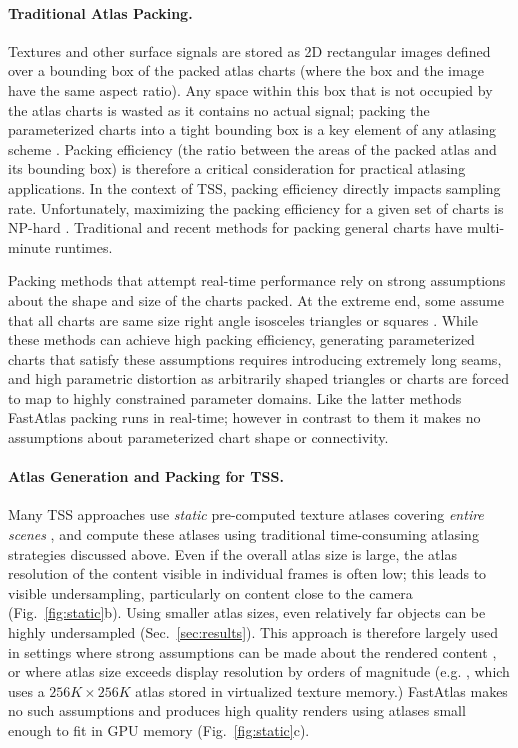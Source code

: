 \paragraph*{Traditional Atlas Packing.} Textures and other surface signals are stored as 2D rectangular images defined over a bounding box of the packed atlas charts (where the box and the image have the same aspect ratio).  Any space within this box that is not occupied by the atlas charts is wasted as it contains no actual signal; packing the parameterized charts into a tight bounding box is a key element of any atlasing scheme \cite{levy2002least,Limper18BoxCutter}. Packing efficiency (the ratio between the areas of the packed atlas and its bounding box) is therefore a critical consideration for practical atlasing applications. In the context of TSS, packing efficiency directly impacts sampling rate. Unfortunately, maximizing the packing efficiency for a given set of charts is NP-hard \cite{Milenkovic1999}. Traditional \cite{levy2002least,igarashi2001adaptive} and recent \cite{Limper18BoxCutter,zhangatlasgeneration,knodt2023uvopt,liu2019atlas} methods for packing general charts have multi-minute runtimes. 

Packing methods that attempt real-time performance rely on strong assumptions about the shape and size of the charts packed. At the extreme end, some assume that all charts are same size right angle isosceles triangles \cite{Maruya:1995,Carr:2002} or squares \cite{purnomo2004seamless}. While these methods can achieve high packing efficiency, generating parameterized charts that satisfy these assumptions requires introducing extremely long seams, and high parametric distortion as arbitrarily shaped triangles or charts are forced to map to highly constrained parameter domains. Like the latter methods FastAtlas packing runs in real-time; however in contrast to them it makes no assumptions about parameterized chart shape or connectivity. 

\paragraph*{Atlas Generation and Packing for TSS.} 
Many TSS approaches use {\em static} pre-computed texture atlases covering {\em entire scenes} \cite{baker:2016, Baker2022, hillesland2016texel},
and compute these atlases using traditional time-consuming atlasing strategies discussed above.
Even if the overall atlas size is large, the atlas resolution of the content visible in individual frames is often low; this leads to visible undersampling, particularly on content close to the camera \cite{Neff2022MSA,Karis:NaniteTalk} (Fig.~\ref{fig:static}b). Using smaller atlas sizes, even relatively far objects can be highly undersampled (Sec.~\ref{sec:results}). This approach is therefore largely used in settings where strong assumptions can be made about the rendered content \cite{baker:2016}, or where atlas size exceeds display resolution by orders of magnitude (e.g. \cite{Baker2022}, which uses a $256K \times 256K$ atlas stored in virtualized texture memory.) FastAtlas makes no such assumptions and produces high quality renders using atlases small enough to fit in GPU memory (Fig.~\ref{fig:static}c).

